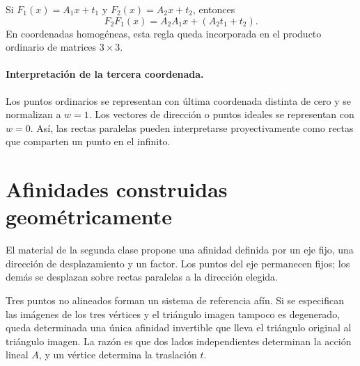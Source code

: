 \begin{resultado}[Composición]
Si \(F_1(x)=A_1x+t_1\) y \(F_2(x)=A_2x+t_2\), entonces
\[
  F_2F_1(x)=A_2A_1x+(A_2t_1+t_2).
\]
En coordenadas homogéneas, esta regla queda incorporada en el producto ordinario de matrices
\(3\times3\).
\end{resultado}

\paragraph{Interpretación de la tercera coordenada.}
Los puntos ordinarios se representan con última coordenada distinta de cero y se normalizan
a \(w=1\). Los vectores de dirección o puntos ideales se representan con \(w=0\). Así, las
rectas paralelas pueden interpretarse proyectivamente como rectas que comparten un punto en
el infinito.

\section{Afinidades construidas geométricamente}\label{sec:afinidades-construidas}

El material de la segunda clase propone una afinidad definida por un eje fijo, una dirección
de desplazamiento y un factor. Los puntos del eje permanecen fijos; los demás se desplazan
sobre rectas paralelas a la dirección elegida.

\begin{center}
\end{center}

\begin{idea}
Tres puntos no alineados forman un sistema de referencia afín. Si se especifican las imágenes
de los tres vértices y el triángulo imagen tampoco es degenerado, queda determinada una única
afinidad invertible que lleva el triángulo original al triángulo imagen. La razón es que dos
lados independientes determinan la acción lineal \(A\), y un vértice determina la traslación
\(t\).
\end{idea}

